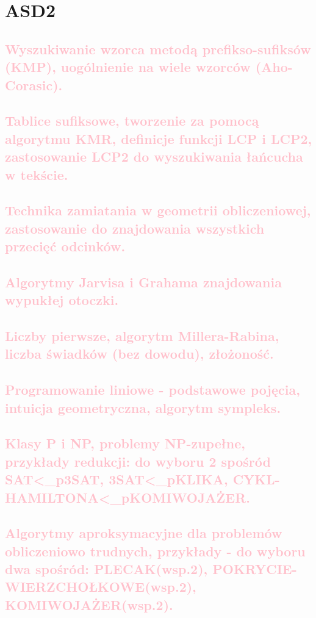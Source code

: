\chapter{ASD2}

\section{\textcolor{pink}{Wyszukiwanie wzorca metodą prefikso-sufiksów (KMP), uogólnienie na wiele wzorców (Aho-Corasic).}}
% 

\section{\textcolor{pink}{Tablice sufiksowe, tworzenie za pomocą algorytmu KMR, definicje funkcji LCP i LCP2, zastosowanie LCP2 do wyszukiwania łańcucha w tekście.}}
% 

\section{\textcolor{pink}{Technika zamiatania w geometrii obliczeniowej, zastosowanie do znajdowania wszystkich przecięć odcinków.}}
% 

\section{\textcolor{pink}{Algorytmy Jarvisa i Grahama znajdowania wypukłej otoczki.}}
% 

\section{\textcolor{pink}{Liczby pierwsze, algorytm Millera-Rabina, liczba świadków (bez dowodu), złożoność.}}
% 

\section{\textcolor{pink}{Programowanie liniowe - podstawowe pojęcia, intuicja geometryczna, algorytm sympleks.}}
% 

\section{\textcolor{pink}{Klasy P i NP, problemy NP-zupełne, przykłady redukcji: do wyboru 2 spośród SAT<_p3SAT, 3SAT<_pKLIKA, CYKL-HAMILTONA<_pKOMIWOJAŻER.}}
% 

\section{\textcolor{pink}{Algorytmy aproksymacyjne dla problemów obliczeniowo trudnych, przykłady - do wyboru dwa spośród: PLECAK(wsp.2), POKRYCIE-WIERZCHOŁKOWE(wsp.2), KOMIWOJAŻER(wsp.2).}}
